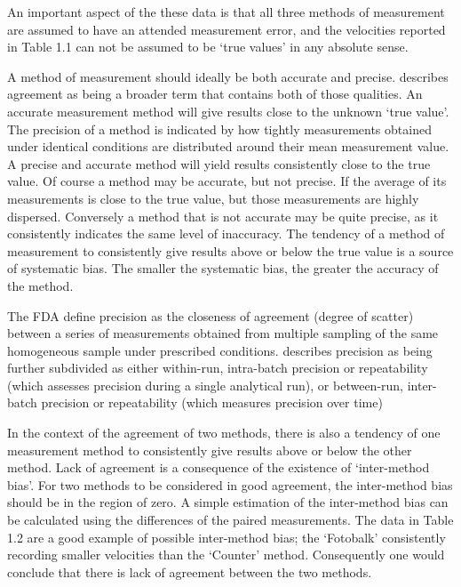 \documentclass[12pt, a4paper]{report}
\begin{document}
An important aspect of the these data is that all three methods of
measurement are assumed to have an attended measurement error, and
the velocities reported in Table 1.1 can not be assumed to be
`true values' in any absolute sense.


A method of measurement should ideally be both accurate and
precise. \citet{Barnhart} describes agreement as being a broader
term that contains both of those qualities. An accurate
measurement method will give results close to the unknown `true
value'. The precision of a method is indicated by how tightly
measurements obtained under identical conditions are distributed
around their mean measurement value. A precise and accurate method
will yield results consistently close to the true value. Of course
a method may be accurate, but not precise. If the average of its
measurements is close to the true value, but those measurements
are highly dispersed. Conversely a method that is not accurate may
be quite precise, as it consistently indicates the same level of
inaccuracy. The tendency of a method of measurement to
consistently give results above or below the true value is a
source of systematic bias. The smaller the systematic bias, the
greater the accuracy of the method.


The FDA define precision as the closeness of agreement (degree of
scatter) between a series of measurements obtained from multiple
sampling of the same homogeneous sample under prescribed
conditions. \citet{Barnhart} describes precision as being further
subdivided as either within-run, intra-batch precision or
repeatability (which assesses precision during a single analytical
run), or between-run, inter-batch precision or repeatability
(which measures precision over time)

In the context of the agreement of two methods, there is also a
tendency of one measurement method to consistently give results
above or below the other method. Lack of agreement is a
consequence of the existence of `inter-method bias'. For two
methods to be considered in good agreement, the inter-method bias
should be in the region of zero. A simple estimation of the
inter-method bias can be calculated using the differences of the
paired measurements. The data in Table 1.2 are a good example of
possible inter-method bias; the `Fotobalk' consistently recording
smaller velocities than the `Counter' method. Consequently one
would conclude that there is lack of agreement between the two
methods.
\end{document}
